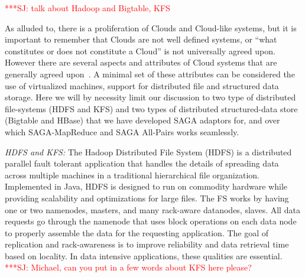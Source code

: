 \documentclass[conference,final]{IEEEtran}
\newcommand{\jhanote}[1]{ {\textcolor{red} { ***SJ: #1 }}}
\newcommand{\jhanote}[1]{}
\newcommand{\sagamapreduce }{SAGA-MapReduce }
\begin{document}
\jhanote{talk about Hadoop and Bigtable, KFS}

As alluded to, there is a proliferation of Clouds and Cloud-like
systems, but it is important to remember that Clouds are not well
defined systems, or ``what constitutes or does not constitute a Cloud''
is not universally agreed upon.  However there are several aspects and
attributes of Cloud systems that are generally agreed
upon~\cite{buyya_hpcc}. A minimal set of these attributes can be
considered the use of virtualized machines, support for distributed
file and structured data storage.  Here we will by necessity limit our
discussion to two type of distributed file-systems (HDFS and KFS) and
two types of distributed structured-data store (Bigtable and HBase)
that we have developed SAGA adaptors for, and over which
\sagamapreduce and SAGA All-Pairs works seamlessly.




{\it HDFS and KFS: }The Hadoop Distributed File System (HDFS) is a
distributed parallel fault tolerant application that handles the
details of spreading data across multiple machines in a traditional
hierarchical file organization.  %
Implemented in Java, HDFS is designed to run on commodity hardware
while providing scalability and optimizations for large files.  The
FS works by having one or two namenodes, masters, and many
rack-aware datanodes, slaves.  All data requests go through the
namenode that uses block operations on each data node to properly
assemble the data for the requesting application.  The goal of
replication and rack-awareness is to improve reliability and data
retrieval time based on locality.  In data intensive applications,
these qualities are essential. \jhanote{Michael, can you put in a few
  words about KFS here please?}
\end{document}
